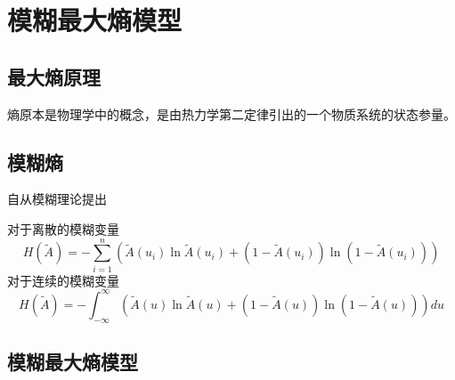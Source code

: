 \chapter[模糊最大熵模型]{模糊最大熵模型}
\section{最大熵原理}
 熵原本是物理学中的概念，是由热力学第二定律引出的一个物质系统的状态参量。
\section{模糊熵}
自从模糊理论提出
\begin{definition}
    对于离散的模糊变量
    \[
        H(\tilde{A})=-\sum_{i=1}^{n}\left(\tilde{A}(u_i) \ln \tilde{A}(u_i)+\left(1-\tilde{A}(u_i)\right) \ln \left(1-\tilde{A}(u_i)\right)\right)
    \]
    对于连续的模糊变量
    \[
        H(\tilde{A})=-\int_{-\infty}^{\infty}(\tilde{A}(u) \ln \tilde{A}(u)+(1-\tilde{A}(u)) \ln (1-\tilde{A}(u))) d u
    \]
\end{definition}


\section{模糊最大熵模型}